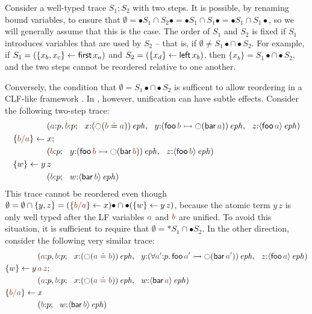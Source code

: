 Consider a well-typed trace $S_1; S_2$ with two steps. It is possible,
by renaming bound variables, to ensure that $\emptyset = {\bullet}S_1
\cap S_2{\bullet} = {\bullet}S_1 \cap S_1{\bullet} = {\bullet}S_1 \cap
S_1{\bullet}$, so we will generally assume that this is the case.  The
order of $S_1$ and $S_2$ is fixed if $S_1$ introduces variables that
are used by $S_2$ -- that is, if $\emptyset \neq S_1{\bullet} \cap
{\bullet}S_2$. For example, if $S_1 = (\{{x_b, x_c}\} \leftarrow {\sf
  first}\,x_a)$ and $S_2 = (\{{x_d}\} \leftarrow {\sf left}\,x_b)$, then
$\{x_b\} = S_1{\bullet} \cap {\bullet}S_2$, and the two steps cannot
be reordered relative to one another. 

Conversely, the condition that $\emptyset = S_1{\bullet} \cap
{\bullet}S_2$ is sufficent to allow reordering in a CLF-like framework
\cite{cervesato12trace}. In \sls, however, unification can have subtle
effects. Consider the following two-step trace:
\begin{align*}
& \qquad\qquad
(\lf{a}{:}p, \lf{b}{:}p; ~~ x{:}\iseph{\left({\ocircle}(\lf{b} \doteq \lf{a})\right)}, ~~
 y{:}\iseph{\left({\sf foo}\,\lf{b} 
                 \lefti {\ocircle}({\sf bar}\, \lf{a})\right)}, ~~
 z{:}\iseph{\susp{{\sf foo}\,\lf{a}}})
\\
& \trstep{\lf{b/a}}{x};
\\
& \qquad\qquad
(\lf{b}{:}p; ~~ 
 y{:}\iseph{\left({\sf foo}\,\lf{b} 
                 \lefti {\ocircle}({\sf bar}\, \lf{b})\right)}, ~~
 z{:}\iseph{\susp{{\sf foo}\,\lf{b}}})
\\
& \trstep{w}{y\,z} 
\\
& \qquad\qquad
(\lf{b}{:}p; ~~ w{:}\iseph{\susp{{\sf bar}\,\lf{b}}})
\end{align*}
This trace cannot be reordered even though $\emptyset = \emptyset \cap
\{ y, z \} = (\trstep{\lf{b/a}}{x}){\bullet} \cap
{\bullet}(\trstep{w}{y\,z})$, because the atomic term $y\,z$ is only
well typed after the LF variables $\lf{a}$ and $\lf{b}$ are unified.
To avoid this situation, it is sufficient to require
that $\emptyset = {\ast}S_1 \cap {\bullet}S_2$. In the other direction,
consider the following very similar trace:
\begin{align*}
& \qquad\qquad
(\lf{a}{:}p, \lf{b}{:}p; ~~ x{:}\iseph{\left({\ocircle}(\lf{a} \doteq \lf{b})\right)}, ~~
 y{:}\iseph{\left(\forall{\lf{a'}}{:}p.\,
                {\sf foo}\,\lf{a'} 
                 \lefti {\ocircle}({\sf bar}\, \lf{a'})\right)}, ~~
 z{:}\iseph{\susp{{\sf foo}\,\lf{a}}})
\\
& \trstep{w}{y\,\lf{a}\,z};
\\
& \qquad\qquad
(\lf{a}{:}p, \lf{b}{:}p; ~~ x{:}\iseph{\left({\ocircle}(\lf{a} \doteq \lf{b})\right)}, ~~
 w{:}\iseph{\susp{{\sf bar}\,\lf{a}}})
\\
& \trstep{\lf{b/a}}{x}
\\
& \qquad\qquad
(\lf{b}{:}p; ~~ w{:}\iseph{\susp{{\sf bar}\,\lf{b}}})
\end{align*}
